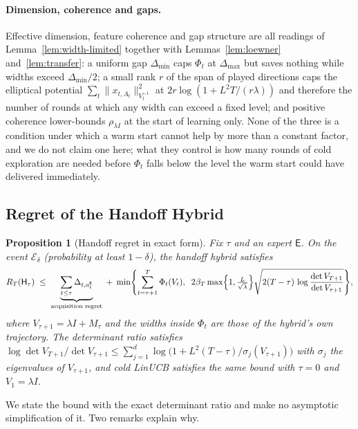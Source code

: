 \documentclass{article}
\newtheorem{proposition}{Proposition}
\theoremstyle{definition}
\theoremstyle{remark}
\theoremstyle{remark}
\newcommand{\Exp}{\mathsf{E}}
\newcommand{\Hyb}{\mathsf{H}}
\begin{document}
\paragraph{Dimension, coherence and gaps.}
Effective dimension, feature coherence and gap structure are all readings of
Lemma~\ref{lem:width-limited} together with Lemmas~\ref{lem:loewner}
and~\ref{lem:transfer}: a uniform gap $\Delta_{\min}$ caps $\Phi_t$ at
$\Delta_{\max}$ but saves nothing while widths exceed $\Delta_{\min}/2$; a small
rank $r$ of the span of played directions caps the elliptical potential
$\sum_t\|x_{t,A_t}\|^2_{V_t^{-1}}$ at $2r\log(1+L^2T/(r\lambda))$ and therefore
the number of rounds at which any width can exceed a fixed level; and positive
coherence lower-bounds $\rho_{\lambda I}$ at the start of learning only. None
of the three is a condition under which a warm start cannot help by more than
a constant factor, and we do not claim one here; what they control is how
many rounds of cold exploration are needed before $\Phi_t$ falls below the
level the warm start could have delivered immediately.


\subsection{Regret of the Handoff Hybrid}
\label{sec:handoff}

\begin{proposition}[Handoff regret in exact form]
\label{thm:handoff}
Fix $\tau$ and an expert $\Exp$. On the event $\mathcal E_\delta$ (probability
at least $1-\delta$), the handoff hybrid satisfies
\begin{equation}
\label{eq:handoff-bound}
R_T(\Hyb_\tau)\;\le\;
\underbrace{\sum_{t\le\tau}\Delta_{t,a_t^{\Exp}}}_{\text{acquisition regret}}
\;+\;
\min\Biggl\{\sum_{t=\tau+1}^{T}\Phi_t(V_t),\;\;
2\beta_T\max\Bigl\{1,\tfrac{L}{\sqrt\lambda}\Bigr\}\sqrt{2(T-\tau)\,\log\frac{\det V_{T+1}}{\det V_{\tau+1}}}\Biggr\},
\end{equation}
where $V_{\tau+1}=\lambda I+M_\tau$ and the widths inside $\Phi_t$ are those
of the hybrid's own trajectory. The determinant ratio satisfies
$\log\det V_{T+1}/\det V_{\tau+1}\le\sum_{j=1}^{d}\log\bigl(1+L^2(T-\tau)/\sigma_j(V_{\tau+1})\bigr)$
with $\sigma_j$ the eigenvalues of $V_{\tau+1}$, and cold LinUCB satisfies the
same bound with $\tau=0$ and $V_1=\lambda I$.
\end{proposition}

We state the bound with the exact determinant ratio and make no asymptotic
simplification of it. Two remarks explain why.
\end{document}
